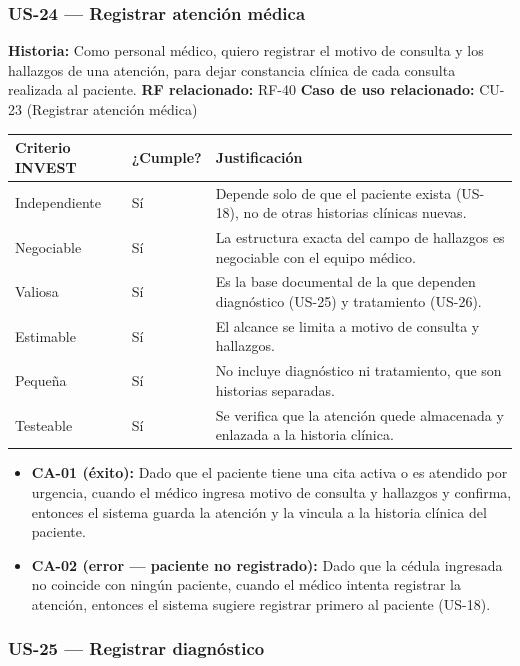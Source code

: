 \documentclass[11pt,a4paper]{article}
\providecommand{\tightlist}{%
	\setlength{\itemsep}{0pt}\setlength{\parskip}{0pt}}
\begin{document}
	\subsubsection{US-24 --- Registrar atención médica}
	
	\textbf{Historia:} Como personal médico, quiero registrar el motivo de consulta y los hallazgos de una atención, para dejar constancia clínica de cada consulta realizada al paciente.
	\textbf{RF relacionado:} RF-40
	\textbf{Caso de uso relacionado:} CU-23 (Registrar atención médica)
	
	\begin{longtable}{p{} p{} p{}}
		\toprule
		\textbf{Criterio INVEST} & \textbf{¿Cumple?} & \textbf{Justificación} \\
		\midrule
		\endhead
		Independiente & Sí & Depende solo de que el paciente exista (US-18), no de otras historias clínicas nuevas. \\
		Negociable & Sí & La estructura exacta del campo de hallazgos es negociable con el equipo médico. \\
		Valiosa & Sí & Es la base documental de la que dependen diagnóstico (US-25) y tratamiento (US-26). \\
		Estimable & Sí & El alcance se limita a motivo de consulta y hallazgos. \\
		Pequeña & Sí & No incluye diagnóstico ni tratamiento, que son historias separadas. \\
		Testeable & Sí & Se verifica que la atención quede almacenada y enlazada a la historia clínica. \\
		\bottomrule
	\end{longtable}
	
	\begin{itemize}
		\tightlist
		\item \textbf{CA-01 (éxito):} Dado que el paciente tiene una cita activa o es atendido por urgencia, cuando el médico ingresa motivo de consulta y hallazgos y confirma, entonces el sistema guarda la atención y la vincula a la historia clínica del paciente.
		\item \textbf{CA-02 (error --- paciente no registrado):} Dado que la cédula ingresada no coincide con ningún paciente, cuando el médico intenta registrar la atención, entonces el sistema sugiere registrar primero al paciente (US-18).
	\end{itemize}
	
	\subsubsection{US-25 --- Registrar diagnóstico}
	
\end{document}
